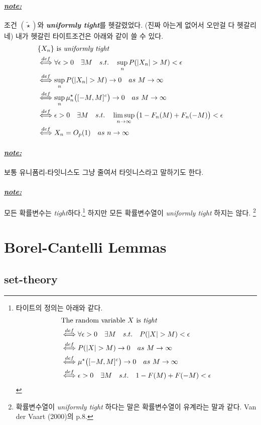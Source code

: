 \documentclass[12pt,oneside,english,a4paper]{article}
\def\note{\paragraph{\Large\textit{\underline{note:}}}\Large}
\begin{document}
\note 조건 $(\tilde\star)$와 \textbf{\emph{uniformly tight}}를 헷갈렸었다. (진짜 아는게 없어서 오만걸 다 헷갈리네) 내가 헷갈린 타이트조건은 아래와 같이 쓸 수 있다. 
\begin{align*}
& \mbox{$\{X_n\}$ is \emph{uniformly tight}} \\
& \overset{def}{\Longleftrightarrow} \forall \epsilon>0 \quad \exists M \quad s.t. \quad \sup_nP(|X_n|>M)<\epsilon \\ 
& \overset{def}{\Longleftrightarrow} \sup_n P(|X_n|>M) \to 0 \quad as ~ M\to \infty \\ 
& \overset{def}{\Longleftrightarrow} \sup_n\mu_n^{\star}\big([-M,M]^c\big) \to 0 \quad as ~ M \to \infty \\ 
& \overset{def}{\Longleftrightarrow} \epsilon>0 \quad \exists M \quad s.t. \quad \limsup_{n\to\infty} \big(1-F_n(M)+F_n(-M)\big) < \epsilon \\ 
& \overset{def}{\Longleftrightarrow} X_n=O_p(1) \quad as ~ n\to\infty 
\end{align*}

\note 보통 유니폼리-타잇니스도 그냥 줄여서 타잇니스라고 말하기도 한다. 

\note 모든 확률변수는 \emph{tight}하다.\footnote{타이트의 정의는 아래와 같다. 
\begin{align*}
& \mbox{The random variable $X$ is \emph{tight}} \\
& \overset{def}{\Longleftrightarrow} \forall \epsilon>0 \quad \exists M \quad s.t. \quad P(|X|>M)<\epsilon \\ 
& \overset{def}{\Longleftrightarrow} P(|X|>M) \to 0 \quad as ~ M\to \infty \\ 
& \overset{def}{\Longleftrightarrow} \mu^{\star}\big([-M,M]^c\big) \to 0 \quad as ~ M \to \infty \\ 
& \overset{def}{\Longleftrightarrow} \epsilon>0 \quad \exists M \quad s.t. \quad 1-F(M)+F(-M) < \epsilon 
\end{align*}} 하지만 모든 확률변수열이 \emph{uniformly tight} 하지는 않다. \footnote{확률변수열이 \emph{uniformly tight} 하다는 말은 확률변수열이 유계라는 말과 같다. Van der Vaart (2000)의 p.8.}

\section{Borel-Cantelli Lemmas}
\subsection{set-theory}
\end{document}

